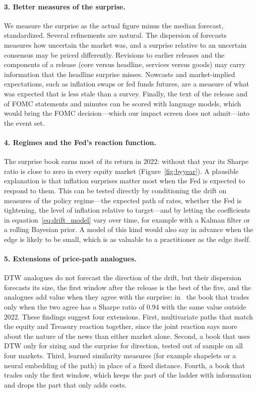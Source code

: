 \paragraph{3. Better measures of the surprise.} We measure the surprise as the actual figure minus
the median forecast, standardized. Several refinements are natural. The dispersion of forecasts
measures how uncertain the market was, and a surprise relative to an uncertain consensus may be
priced differently. Revisions to earlier releases and the components of a release (core versus
headline, services versus goods) may carry information that the headline surprise misses. Nowcasts
and market-implied expectations, such as inflation swaps or fed funds futures, are a measure of what
was expected that is less stale than a survey. Finally, the text of the release and of FOMC
statements and minutes can be scored with language models, which would bring the FOMC decision---which
our impact screen does not admit---into the event set.

\paragraph{4. Regimes and the Fed's reaction function.} The surprise book earns most of its return in
2022: without that year its Sharpe ratio is close to zero in every equity market
(Figure~\ref{fig:byyear}). A plausible explanation is that inflation surprises matter most when the
Fed is expected to respond to them. This can be tested directly by conditioning the drift on
measures of the policy regime---the expected path of rates, whether the Fed is tightening, the
level of inflation relative to target---and by letting the coefficients in
equation~\eqref{eq:drift_model} vary over time, for example with a Kalman filter or a rolling
Bayesian prior. A model of this kind would also say in advance when the edge is likely to be small,
which is as valuable to a practitioner as the edge itself.

\paragraph{5. Extensions of price-path analogues.} DTW analogues do not forecast the direction of
the drift, but their dispersion forecasts its size, the first window after the release is the best of the five, and the analogues add value when they agree with the surprise:
in \YM\ the book that trades only when the two agree has a Sharpe ratio of 0.94 with the same value
outside 2022. These findings suggest four extensions. First, multivariate paths that match the equity
and Treasury reaction together, since the joint reaction says more about the nature of the news
than either market alone. Second, a book that uses DTW only for sizing and the surprise for direction,
tested out of sample on all four markets. Third, learned similarity measures (for example shapelets or
a neural embedding of the path) in place of a fixed distance. Fourth, a book that trades only the
first window, which keeps the part of the ladder with information and drops the part that only adds
costs.

